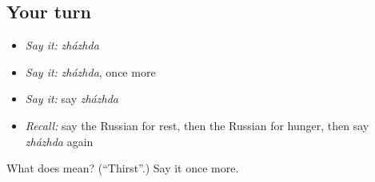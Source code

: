 \subsection*{Your turn}
\begin{itemize}
\raggedright
  \item \emph{Say it:} \emph{zházhda}
  \item \emph{Say it:} \emph{zházhda}, once more
  \item \emph{Say it:} say \emph{zházhda}
  \item \emph{Recall:} say the Russian for rest, then the Russian for hunger, then say \emph{zházhda} again
\end{itemize}

\begin{tcolorbox}[breakable,colback=teal!4,colframe=teal!35!black,title={Before you move on}]
What does  mean? (\textquotedblleft{}Thirst\textquotedblright{}.) Say it once more.
\end{tcolorbox}
